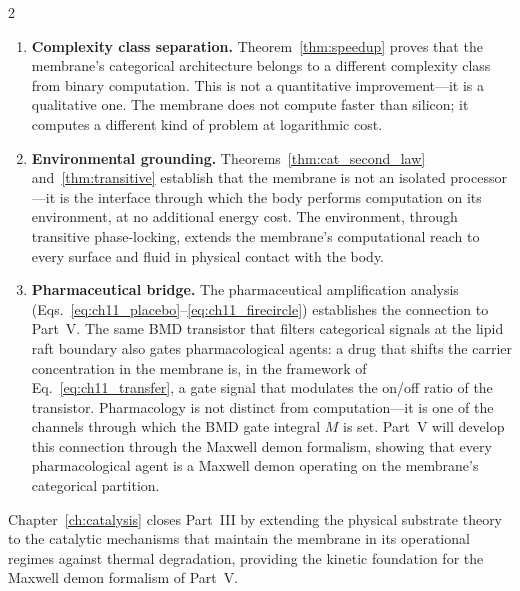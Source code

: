 \begin{multicols}{2}
\begin{enumerate}
\item \textbf{Complexity class separation.} Theorem~\ref{thm:speedup} proves that the membrane's categorical architecture belongs to a different complexity class from binary computation. This is not a quantitative improvement---it is a qualitative one. The membrane does not compute faster than silicon; it computes a different kind of problem at logarithmic cost.

\item \textbf{Environmental grounding.} Theorems~\ref{thm:cat_second_law} and~\ref{thm:transitive} establish that the membrane is not an isolated processor---it is the interface through which the body performs computation on its environment, at no additional energy cost. The environment, through transitive phase-locking, extends the membrane's computational reach to every surface and fluid in physical contact with the body.

\item \textbf{Pharmaceutical bridge.} The pharmaceutical amplification analysis (Eqs.~\ref{eq:ch11_placebo}--\ref{eq:ch11_firecircle}) establishes the connection to Part~V. The same BMD transistor that filters categorical signals at the lipid raft boundary also gates pharmacological agents: a drug that shifts the carrier concentration in the membrane is, in the framework of Eq.~\ref{eq:ch11_transfer}, a gate signal that modulates the on/off ratio of the transistor. Pharmacology is not distinct from computation---it is one of the channels through which the BMD gate integral $M$ is set. Part~V will develop this connection through the Maxwell demon formalism, showing that every pharmacological agent is a Maxwell demon operating on the membrane's categorical partition.

\end{enumerate}

Chapter~\ref{ch:catalysis} closes Part~III by extending the physical substrate theory to the catalytic mechanisms that maintain the membrane in its operational regimes against thermal degradation, providing the kinetic foundation for the Maxwell demon formalism of Part~V.

\end{multicols}
